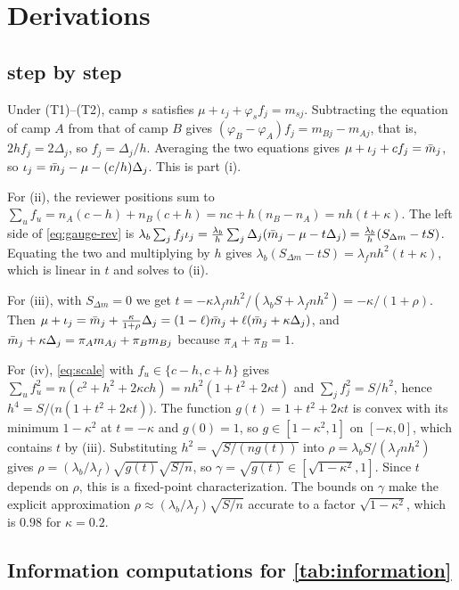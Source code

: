 \section{Derivations}\label{app:proofs}

\subsection{\texorpdfstring{}{The majoritarian-leak proposition} step by step}

Under (T1)--(T2), camp $s$ satisfies $\mu+\iota_j+\varphi_sf_j=m_{sj}$. Subtracting the equation of
camp $A$ from that of camp $B$ gives $(\varphi_B-\varphi_A)f_j=m_{Bj}-m_{Aj}$, that is,
$2hf_j=2\Delta_j$, so $f_j=\Delta_j/h$. Averaging the two equations gives
$\mu+\iota_j+cf_j=\bar m_j$, so $\iota_j=\bar m_j-\mu-(c/h)\Delta_j$. This is part (i).

For (ii), the reviewer positions sum to
$\sum_uf_u=n_A(c-h)+n_B(c+h)=nc+h(n_B-n_A)=nh(t+\kappa)$. The left side of
\eqref{eq:gauge-rev} is
$\lambda_b\sum_jf_j\iota_j=\frac{\lambda_b}{h}\sum_j\Delta_j(\bar m_j-\mu-t\Delta_j)
=\frac{\lambda_b}{h}(S_{\Delta m}-tS)$. Equating the two and multiplying by $h$ gives
$\lambda_b(S_{\Delta m}-tS)=\lambda_fnh^2(t+\kappa)$, which is linear in $t$ and solves to (ii).

For (iii), with $S_{\Delta m}=0$ we get $t=-\kappa\lambda_fnh^2/(\lambda_bS+\lambda_fnh^2)=-\kappa/(1+\rho)$.
Then $\mu+\iota_j=\bar m_j+\frac{\kappa}{1+\rho}\Delta_j=(1-\ell)\bar m_j+\ell(\bar m_j+\kappa\Delta_j)$,
and $\bar m_j+\kappa\Delta_j=\pi_Am_{Aj}+\pi_Bm_{Bj}$ because $\pi_A+\pi_B=1$.

For (iv), \eqref{eq:scale} with $f_u\in\{c-h,c+h\}$ gives
$\sum_uf_u^2=n(c^2+h^2+2\kappa ch)=nh^2(1+t^2+2\kappa t)$ and $\sum_jf_j^2=S/h^2$, hence
$h^4=S/\bigl(n(1+t^2+2\kappa t)\bigr)$. The function $g(t)=1+t^2+2\kappa t$ is convex with its
minimum $1-\kappa^2$ at $t=-\kappa$ and $g(0)=1$, so $g\in[1-\kappa^2,1]$ on $[-\kappa,0]$, which
contains $t$ by (iii). Substituting
$h^2=\sqrt{S/(ng(t))}$ into $\rho=\lambda_bS/(\lambda_fnh^2)$ gives
$\rho=(\lambda_b/\lambda_f)\sqrt{g(t)}\sqrt{S/n}$, so $\gamma=\sqrt{g(t)}\in[\sqrt{1-\kappa^2},1]$.
Since $t$ depends on $\rho$, this is a fixed-point characterization. The bounds on $\gamma$ make the
explicit approximation $\rho\approx(\lambda_b/\lambda_f)\sqrt{S/n}$ accurate to a factor
$\sqrt{1-\kappa^2}$, which is $0.98$ for $\kappa=0.2$.

\subsection{Information computations for \texorpdfstring{\cref{tab:information}}{the information table}}

